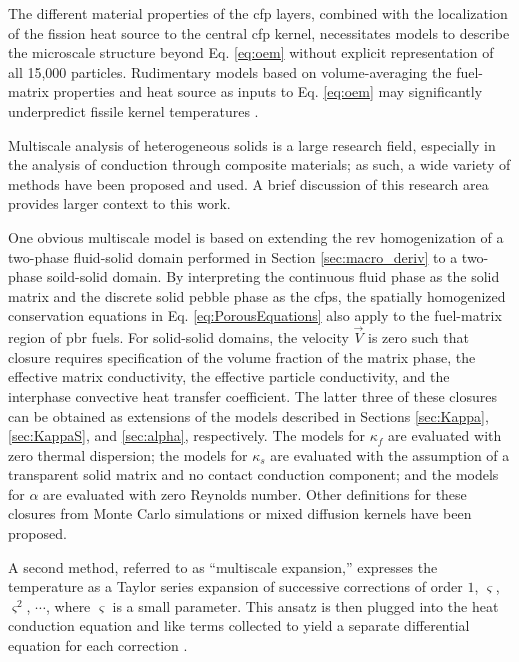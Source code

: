 The different material properties of the \gls{cfp} layers, combined with the localization of the fission heat source to the central \gls{cfp} kernel, necessitates models to describe the microscale structure beyond Eq. \eqref{eq:oem} without explicit representation of all 15,000 particles. Rudimentary models based on volume-averaging the fuel-matrix properties and heat source as inputs to Eq. \eqref{eq:oem} may significantly underpredict fissile kernel temperatures \cite{brown_fcm,kamalpour, novak_2019}.

Multiscale analysis of heterogeneous solids is a large research field, especially in the analysis of conduction through composite materials; as such, a wide variety of methods have been proposed and used. A brief discussion of this research area provides larger context to this work. 

One obvious multiscale model is based on extending the \gls{rev} homogenization of a two-phase fluid-solid domain performed in Section \ref{sec:macro_deriv} to a two-phase soild-solid domain. By interpreting the continuous fluid phase as the solid matrix and the discrete solid pebble phase as the \glspl{cfp}, the spatially homogenized conservation equations in Eq. \eqref{eq:PorousEquations} also apply to the fuel-matrix region of \gls{pbr} fuels. For solid-solid domains, the velocity \(\vec{V}\) is zero such that closure requires specification of the volume fraction of the matrix phase, the effective matrix conductivity, the effective particle conductivity, and the interphase convective heat transfer coefficient. The latter three of these closures can be obtained as extensions of the models described in Sections \ref{sec:Kappa}, \ref{sec:KappaS}, and \ref{sec:alpha}, respectively. The models for \(\kappa_f\) are evaluated with zero thermal dispersion; the models for \(\kappa_s\) are evaluated with the assumption of a transparent solid matrix and no contact conduction component; and the models for \(\alpha\) are evaluated with zero Reynolds number. Other definitions for these closures from Monte Carlo simulations \cite{cho} or mixed diffusion kernels \cite{espinosa} have been proposed. 

A second method, referred to as ``multiscale expansion,'' expresses the temperature as a Taylor series expansion of successive corrections of order \(1\), \(\varsigma\), \(\varsigma^2\), \(\cdots\), where \(\varsigma\) is a small parameter. This ansatz is then plugged into the heat conduction equation and like terms collected to yield a separate differential equation for each correction \cite{weinan}. 

